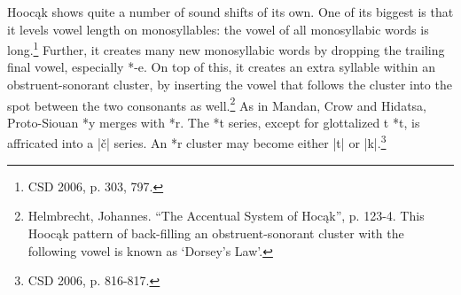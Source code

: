 \documentclass[output=paper]{LSP/langsci}
\begin{document}
Hooc\k{a}k shows quite a number of sound shifts of its own.  One of its biggest is that it levels vowel length on monosyllables: the vowel of all monosyllabic words is long.\footnote{CSD 2006, p. 303, 797.} Further, it creates many new monosyllabic words by dropping the trailing final vowel, especially *-e.  On top of this, it creates an extra syllable within an obstruent-sonorant cluster, by inserting the vowel that follows the cluster into the spot between the two consonants as well.\footnote{Helmbrecht, Johannes. ``The Accentual System of Hoc\k{a}k'', p. 123-4. This Hooc\k{a}k pattern of back-filling an obstruent-sonorant cluster with the following vowel is known as `Dorsey's Law'.}  As in Mandan, Crow and Hidatsa, Proto-Siouan *y merges with *r.  The *t series, except for glottalized t *t\textsuperscript{}, is affricated into a |\v{c}| series.  An *r\textsuperscript{} cluster may become either |t\textsuperscript{}| or |k\textsuperscript{}|.\footnote{CSD 2006, p. 816-817.}
\end{document}
